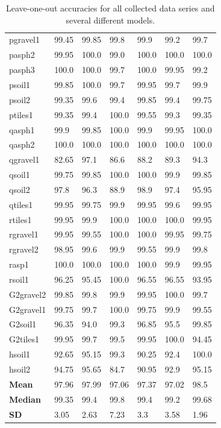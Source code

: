 \begin{table}
\begin{center}
\begin{adjustbox}{totalheight=\baselineskip}
\begin{tabular}{|l|l|l|l|l|l|l|}
		pgravel1 & 99.45 & 99.85 & 99.8 & 99.9 & 99.2 & 99.7\\
		pasph2 & 99.95 & 100.0 & 99.0 & 100.0 & 100.0 & 100.0\\
		pasph3 & 100.0 & 100.0 & 99.7 & 100.0 & 99.95 & 99.2\\
		psoil1 & 99.85 & 100.0 & 99.7 & 99.95 & 99.7 & 99.9\\
		psoil2 & 99.35 & 99.6 & 99.4 & 99.85 & 99.4 & 99.75\\
		ptiles1 & 99.35 & 99.4 & 100.0 & 99.55 & 99.3 & 99.35\\
		qasph1 & 99.9 & 99.85 & 100.0 & 99.9 & 99.95 & 100.0\\
		qasph2 & 100.0 & 100.0 & 100.0 & 100.0 & 100.0 & 100.0\\
		qgravel1 & \cellcolor{red!20}82.65 & 97.1 & \cellcolor{red!20}86.6 & \cellcolor{red!20}88.2 & \cellcolor{red!20}89.3 & 94.3\\
		qsoil1 & 99.75 & 99.85 & 100.0 & 100.0 & 99.9 & 99.85\\
		qsoil2 & 97.8 & 96.3 & \cellcolor{red!20}88.9 & 98.9 & 97.4 & 95.95\\
		qtiles1 & 99.95 & 99.75 & 99.9 & 99.95 & 99.6 & 99.95\\
		rtiles1 & 99.95 & 99.9 & 100.0 & 100.0 & 100.0 & 99.95\\
		rgravel1 & 99.95 & 99.55 & 100.0 & 100.0 & 99.95 & 99.75\\
		rgravel2 & 98.95 & 99.6 & 99.9 & 99.55 & 99.9 & 99.8\\
		rasp1 & 100.0 & 100.0 & 100.0 & 100.0 & 99.9 & 99.95\\
		rsoil1 & 96.25 & 95.45 & 100.0 & 96.55 & 96.55 & 93.95\\
		G2gravel2 & 99.85 & 99.8 & 99.9 & 99.95 & 100.0 & 99.7\\
		G2gravel1 & 99.75 & 99.7 & 100.0 & 99.75 & 99.9 & 99.55\\
		G2soil1 & 96.35 & 94.0 & 99.3 & 96.85 & 95.5 & 99.85\\
		G2tiles1 & 99.95 & 99.7 & 99.5 & 99.95 & 100.0 & 94.45\\
		hsoil1 & 92.65 & 95.15 & 99.3 & 90.25 & 92.4 & 100.0\\
		hsoil2 & 94.75 & 95.65 & \cellcolor{red!20}84.7 & 90.95 & 92.9 & 95.15\\
		\hline
		\textbf{Mean} & 97.96 & 97.99 & 97.06 & 97.37 & 97.02 & \cellcolor{green!20}98.5\\
		\textbf{Median} & 99.35 & 99.4 & \cellcolor{green!20}99.8 & 99.4 & 99.2 & 99.68\\
		\textbf{SD} & 3.05 & 2.63 & 7.23 & 3.3 & 3.58 & \cellcolor{green!20}1.96\\
		\hline
		\end{tabular}
	\end{adjustbox}
	\end{center}
	\label{tab:loo}
	\caption{Leave-one-out accuracies for all collected data series and several different models.}
\end{table}


